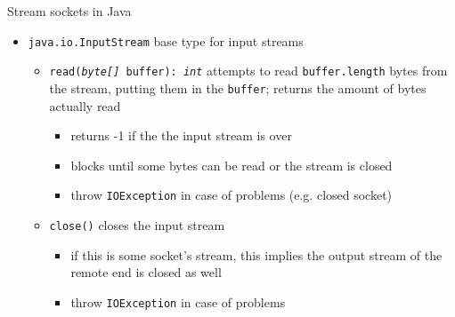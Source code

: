 \documentclass[presentation]{beamer}\mode<presentation>{\usetheme{AMSBolognaFC}}
\begin{document}
\begin{frame}[c, allowframebreaks]{Stream sockets in Java}
\begin{itemize}
        \item \texttt{java.io.\alert{InputStream}} base type for input streams 
        \begin{itemize}
            \item \alert{\texttt{read(\textit{byte[]} buffer): \textit{int}}} attempts to read \texttt{buffer.length} bytes from the stream, putting them in the \texttt{buffer}; returns the amount of bytes actually read
            \begin{itemize}
                \item returns -1 if the the input stream is over
                \item blocks until some bytes can be read or the stream is closed
                \item throw \texttt{IOException} in case of problems (e.g. closed socket)
            \end{itemize}
            \item \alert{\texttt{close()}} closes the input stream
            \begin{itemize}
                \item if this is some socket's stream, this implies the output stream of the remote end is closed as well
                \item throw \texttt{IOException} in case of problems
            \end{itemize}
        \end{itemize}

        \framebreak


\end{itemize}
\end{frame}
\end{document}
